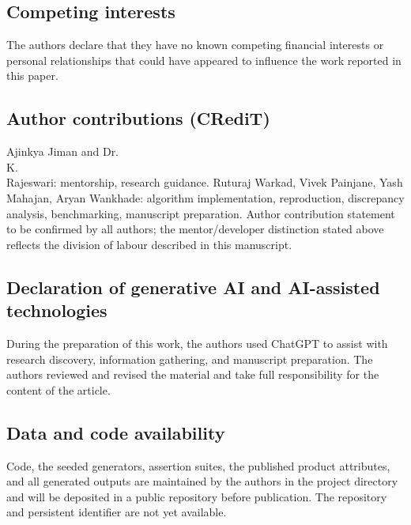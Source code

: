 \documentclass[a4paper]{elsarticle}
\begin{document}
\subsection{Competing interests}
The authors declare that they have no known competing financial interests or personal relationships that could have appeared to influence the work reported in this paper.

\subsection{Author contributions (CRediT)}
Ajinkya Jiman and Dr.\\ K.\\ Rajeswari: mentorship, research guidance. Ruturaj Warkad, Vivek Painjane, Yash Mahajan, Aryan Wankhade: algorithm implementation, reproduction, discrepancy analysis, benchmarking, manuscript preparation. Author contribution statement to be confirmed by all authors; the mentor/developer distinction stated above reflects the division of labour described in this manuscript.

\subsection{Declaration of generative AI and AI-assisted technologies}
During the preparation of this work, the authors used ChatGPT to assist with research discovery, information gathering, and manuscript preparation. The authors reviewed and revised the material and take full responsibility for the content of the article.

\subsection{Data and code availability}
Code, the seeded generators, assertion suites, the published product attributes, and all generated outputs are maintained by the authors in the project directory and will be deposited in a public repository before publication. The repository and persistent identifier are not yet available.



\end{document}
